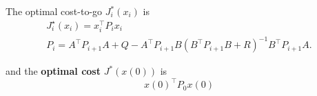 The optimal cost-to-go $J_i^*(x_i)$ is
\noindent\begin{gather*}
    J_{i}^{\star}(x_{i})  = x_{i}^{\top}P_{i}x_{i}                                    \\
    P_{i} = A^\top P_{i+1} A+Q-A^\top P_{i+1} B{(B^\top P_{i+1} B+R)}^{-1}B^\top P_{i+1} A.
\end{gather*}

and the \textbf{optimal cost} $J^*(x(0))$ is
\noindent\begin{equation*}
    {x(0)}^\top P_0 x(0)
\end{equation*}